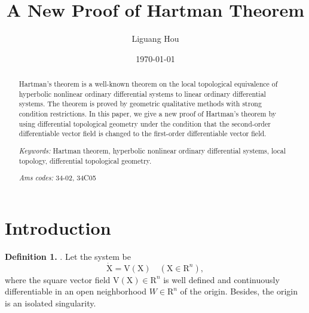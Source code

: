 \documentclass[11pt]{diazessay} %
\title{\textbf{A New Proof of Hartman Theorem} } %
\author{Liguang Hou} %
\date{\today} %
\begin{document}
\maketitle %



\begin{abstract}
	\noindent
	Hartman's theorem is a well-known theorem on the local topological equivalence of hyperbolic nonlinear ordinary differential systems to linear ordinary differential systems. The theorem is proved by geometric qualitative methods with strong condition restrictions. In this paper, we give a new proof of Hartman's theorem by using differential topological geometry under the condition that the second-order differentiable vector field is changed to the first-order differentiable vector field.

	\vskip 5pt

	\noindent
	\textit{Keywords:} Hartman theorem, hyperbolic nonlinear ordinary differential systems, local topology, differential topological geometry. %
	
	\noindent
	\textit{Ams codes:} 34-02, 34C05
\end{abstract}
\vspace{30pt} %


\section*{Introduction}

\textbf{Definition 1.} \cite{1} \cite{2}. Let the system be
\begin{equation}
	\dot{\mathrm{X}}=\mathrm{V}(\mathrm{X}) \quad\left(\mathrm{X} \in \mathrm{R}^{n}\right),
\end{equation}
where the square vector field $ \mathrm{V}(\mathrm{X}) \in \mathrm{R}^{n} $ is well defined  and continuously differentiable in an open neighborhood $ W \in \mathrm{R}^{n} $ of the origin.
Besides, the origin is an isolated singularity. 
\end{document}
